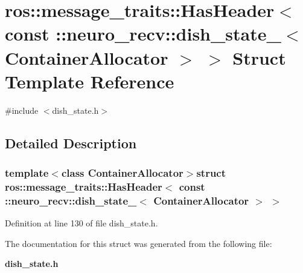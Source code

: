 \section{ros\-:\-:message\-\_\-traits\-:\-:\-Has\-Header$<$ const \-:\-:neuro\-\_\-recv\-:\-:dish\-\_\-state\-\_\-$<$ \-Container\-Allocator $>$ $>$ \-Struct \-Template \-Reference}
\label{structros_1_1message__traits_1_1HasHeader_3_01const_01_1_1neuro__recv_1_1dish__state___3_01ContainerAllocator_01_4_01_4}


{\ttfamily \#include $<$dish\-\_\-state.\-h$>$}



\subsection{\-Detailed \-Description}
\subsubsection*{template$<$class Container\-Allocator$>$struct ros\-::message\-\_\-traits\-::\-Has\-Header$<$ const \-::neuro\-\_\-recv\-::dish\-\_\-state\-\_\-$<$ Container\-Allocator $>$ $>$}



\-Definition at line 130 of file dish\-\_\-state.\-h.



\-The documentation for this struct was generated from the following file\-:\begin{DoxyCompactItemize}
\item 
{\bf dish\-\_\-state.\-h}\end{DoxyCompactItemize}

